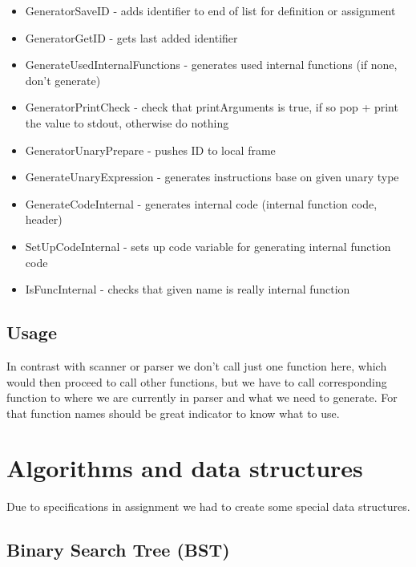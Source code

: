\documentclass[11pt, titlepage]{article}
\begin{document}
\begin{itemize}[itemsep=-5pt]
\item
  GeneratorSaveID - adds identifier to end of list for definition or
  assignment
\item
  GeneratorGetID - gets last added identifier
\item
  GenerateUsedInternalFunctions - generates used internal functions (if
  none, don't generate)
\item
  GeneratorPrintCheck - check that printArguments is true, if so pop +
  print the value to stdout, otherwise do nothing
\item
  GeneratorUnaryPrepare - pushes ID to local frame
\item
  GenerateUnaryExpression - generates instructions base on given unary type
\item
  GenerateCodeInternal - generates internal code (internal function
  code, header)
\item
  SetUpCodeInternal - sets up code variable for generating internal
  function code
\item
  IsFuncInternal - checks that given name is really internal function
\end{itemize}

\subsection{Usage}\label{usage-2}

In contrast with scanner or parser we
don't call just one function here, which would then proceed to call
other functions, but we have to call corresponding function to where we
are currently in parser and what we need to generate. For that function
names should be great indicator to know what to use.





\section{Algorithms and data
structures}\label{algorithms-and-data-structures}

Due to specifications in assignment we had to create some special
data structures.

\subsection{Binary Search Tree (BST)}\label{binary-search-tree-bst}
\end{document}
